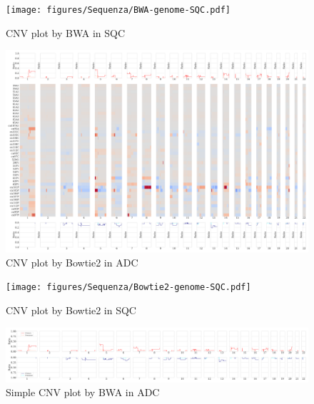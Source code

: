 \documentclass[11pt,a4paper,onecolumn,oneside]{report}
\begin{document}
                \begin{figure}[p]
                    \centering
                    \texttt{[image: figures/Sequenza/BWA-genome-SQC.pdf]}
                    \caption{CNV plot by BWA in SQC}
                    \label{fig:CNV-BWA-SQC}
                \end{figure}

                \begin{figure}[p]
                    \centering
                    \includegraphics[width=\linewidth]{figures/Sequenza/Bowtie2-genome-ADC.pdf}
                    \caption{CNV plot by Bowtie2 in ADC}
                    \label{fig:CNV-Bowtie2-ADC}
                \end{figure}

                \begin{figure}[p]
                    \centering
                    \texttt{[image: figures/Sequenza/Bowtie2-genome-SQC.pdf]}
                    \caption{CNV plot by Bowtie2 in SQC}
                    \label{fig:CNV-Bowtie2-SQC}
                \end{figure}

                \begin{figure}[p]
                    \centering
                    \includegraphics[width=\linewidth]{figures/Sequenza/BWA-simple-ADC.pdf}
                    \caption{Simple CNV plot by BWA in ADC}
                    \label{fig:SimpleCNV-BWA-ADC}
                \end{figure}
\end{document}
